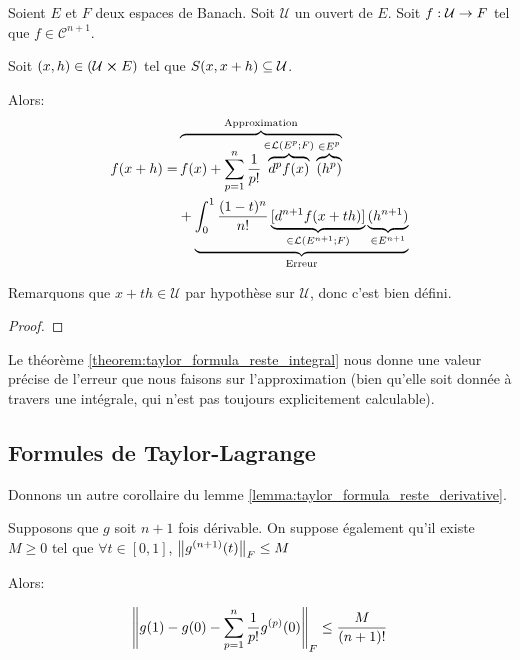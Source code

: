 \begin{theorem}
	\label{theorem:taylor_formula_reste_integral}
	Soient $E$ et $F$ deux espaces de Banach. Soit $\mathcal{U}$ un ouvert de
	$E$.
	Soit $f : \mathcal{U} \rightarrow F$ tel que $f \in \mathcal{C}^{n + 1}$.

	Soit $(x, h) \in (\mathcal{U} \cross E)$ tel que $S(x, x + h)
	\subseteq \mathcal{U}$.

	Alors:
	\begin{align*}
		f(x + h) = & \overbrace
		{
			f(x) + \displaystyle \sum_{p = 1}^{n} \frac{1}{p!}
			\overbrace{d^{p}f(x)}^{\in \mathcal{L}(E^{p}; F)}
			\overbrace{(h^{p})}^{\in E^{p}}
		}^{\text{Approximation}} \\
		& + \underbrace
		{
			\int_{0}^{1} \frac{(1 - t)^{n}}{n!} \underbrace{[d^{n + 1}f(x +
			th)]}_{\in \mathcal{L}(E^{n+1}; F)} \underbrace{(h^{n+1})}_{\in E^{n +
			1}}
		}_{\text{Erreur}}
	\end{align*}

	Remarquons que $x + th \in \mathcal{U}$ par hypothèse sur $\mathcal{U}$,
	donc c'est bien défini.
\end{theorem}

\ifdefined\outputproof
\begin{proof}

\end{proof}
\fi

Le théorème \ref{theorem:taylor_formula_reste_integral} nous donne une valeur
précise de l'erreur que nous faisons sur l'approximation (bien qu'elle soit
donnée à travers une intégrale, qui n'est pas toujours explicitement
calculable).

\subsection{Formules de Taylor-Lagrange}

Donnons un autre corollaire du lemme
\ref{lemma:taylor_formula_reste_derivative}.

\begin{corollary}
	Supposons que $g$ soit $n + 1$ fois dérivable.
	On suppose également qu'il existe $M \geq 0$ tel que $\forall t \in [0, 1]$,
	$\norm{g^{(n + 1)}(t)}_{F} \leq M$

	Alors:

	\begin{equation*}
		\norm{g(1) - g(0) - \displaystyle \sum_{p = 1}^{n} \frac{1}{p!}
		g^{(p)}(0)}_{F} \leq \frac{M}{(n + 1)!}
	\end{equation*}
\end{corollary}

